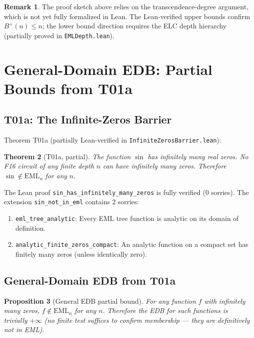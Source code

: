 \documentclass[12pt]{article}
\newtheorem{theorem}{Theorem}
\newtheorem{proposition}[theorem]{Proposition}
\theoremstyle{definition}
\newtheorem{remark}[theorem]{Remark}
\begin{document}
\begin{remark}
The proof sketch above relies on the transcendence-degree argument, which is
not yet fully formalized in Lean.  The Lean-verified upper bounds confirm
$B^+(n) \leq n$; the lower bound direction requires the ELC depth hierarchy
(partially proved in \texttt{EMLDepth.lean}).
\end{remark}

\section{General-Domain EDB: Partial Bounds from T01a}

\subsection{T01a: The Infinite-Zeros Barrier}

Theorem T01a (partially Lean-verified in \texttt{InfiniteZerosBarrier.lean}):

\begin{theorem}[T01a, partial]
The function $\sin$ has infinitely many real zeros.  No F16 circuit of any
finite depth $n$ can have infinitely many zeros.  Therefore $\sin \notin
\mathrm{EML}_n$ for any $n$.
\end{theorem}

The Lean proof \texttt{sin\_has\_infinitely\_many\_zeros} is fully verified (0 sorries).
The extension \texttt{sin\_not\_in\_eml} contains 2 sorries:
\begin{enumerate}
  \item \texttt{eml\_tree\_analytic}: Every EML tree function is analytic on
    its domain of definition.
  \item \texttt{analytic\_finite\_zeros\_compact}: An analytic function on a
    compact set has finitely many zeros (unless identically zero).
\end{enumerate}

\subsection{General-Domain EDB from T01a}

\begin{proposition}[General EDB partial bound]
For any function $f$ with infinitely many zeros, $f \notin \mathrm{EML}_n$ for
any $n$.  Therefore the EDB for such functions is trivially $+\infty$ (no
finite test suffices to confirm membership — they are definitively not in EML).
\end{proposition}
\end{document}
